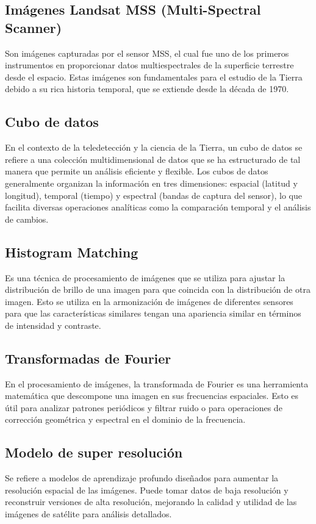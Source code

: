         \subsection{Imágenes Landsat MSS (Multi-Spectral Scanner)}
            Son imágenes capturadas por el sensor MSS, el cual fue uno de los primeros instrumentos en proporcionar datos multiespectrales de la superficie terrestre desde el espacio. Estas imágenes son fundamentales para el estudio de la Tierra debido a su rica historia temporal, que se extiende desde la década de 1970.
            
        \subsection{Cubo de datos}
            En el contexto de la teledetección y la ciencia de la Tierra, un cubo de datos se refiere a una colección multidimensional de datos que se ha estructurado de tal manera que permite un análisis eficiente y flexible. Los cubos de datos generalmente organizan la información en tres dimensiones: espacial (latitud y longitud), temporal (tiempo) y espectral (bandas de captura del sensor), lo que facilita diversas operaciones analíticas como la comparación temporal y el análisis de cambios.
            
        \subsection{Histogram Matching}
            Es una técnica de procesamiento de imágenes que se utiliza para ajustar la distribución de brillo de una imagen para que coincida con la distribución de otra imagen. Esto se utiliza en la armonización de imágenes de diferentes sensores para que las características similares tengan una apariencia similar en términos de intensidad y contraste.
            
        \subsection{Transformadas de Fourier}
            En el procesamiento de imágenes, la transformada de Fourier es una herramienta matemática que descompone una imagen en sus frecuencias espaciales. Esto es útil para analizar patrones periódicos y filtrar ruido o para operaciones de corrección geométrica y espectral en el dominio de la frecuencia.
            
        \subsection{Modelo de super resolución}
            Se refiere a modelos de aprendizaje profundo diseñados para aumentar la resolución espacial de las imágenes. Puede tomar datos de baja resolución y reconstruir versiones de alta resolución, mejorando la calidad y utilidad de las imágenes de satélite para análisis detallados.
        
